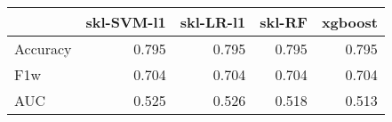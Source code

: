 \begin{tabular}{lrrrr}
\toprule
{} &  skl-SVM-l1 &  skl-LR-l1 &  skl-RF &  xgboost \\
\midrule
Accuracy &       0.795 &      0.795 &   0.795 &    0.795 \\
F1w      &       0.704 &      0.704 &   0.704 &    0.704 \\
AUC      &       0.525 &      0.526 &   0.518 &    0.513 \\
\bottomrule
\end{tabular}
